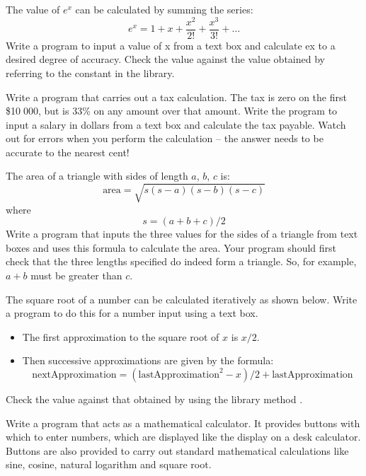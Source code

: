 \begin{EXE}
			\item {} The value of $e^x$ can be calculated by summing the series:
				\begin{equation*}
					e^x = 1 + x + \frac{x^2}{2!} + \frac{x^3}{3!} + …
				\end{equation*}
				Write a program to input a value of x from a text box and calculate ex to a desired degree of accuracy. Check the value against the value obtained by referring to the constant  in the  library.
			\item {} Write a program that carries out a tax calculation. The tax is zero on the first \$10 000, but is 33\% on any amount over that amount. Write the program to input a salary in dollars from a text box and calculate the tax payable. Watch out for errors when you perform the calculation – the answer needs to be accurate to the nearest cent!
			\item {} The area of a triangle with sides of length $a$, $b$, $c$ is:
				\begin{equation*}
					\text{area} = \sqrt{s (s-a) (s-b) (s-c)}
				\end{equation*}
				where
				\begin{equation*}
					s = (a + b + c)/2
				\end{equation*}
				Write a program that inputs the three values for the sides of a triangle from text boxes and uses this formula to calculate the area. Your program should first check that the three lengths specified do indeed form a triangle. So, for example, $a + b$ must be greater than $c$.
			\item	{} The square root of a number can be calculated iteratively as shown below. Write a program to do this for a number input using a text box.
				\begin{itemize}
		      \item The first approximation to the square root of $x$ is $x/2$.
    		  \item Then successive approximations are given by the formula:
						\begin{equation*}
							\text{nextApproximation} = (\text{lastApproximation}^2 - x)/2 + \text{lastApproximation}
						\end{equation*}
				\end{itemize}
				Check the value against that obtained by using the library method .
			\item	{} Write a program that acts as a mathematical calculator. It provides buttons with which to enter numbers, which are displayed like the display on a desk calculator. Buttons are also provided to carry out standard mathematical calculations like sine, cosine, natural logarithm and square root.

\end{EXE}
